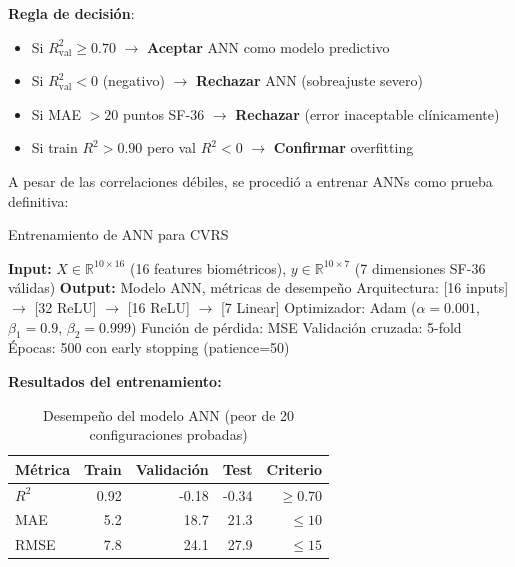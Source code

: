 \documentclass[12pt,letterpaper,twoside]{report}
\newcommand{\R}{\mathbb{R}}
\begin{document}
\begin{calculobox}
\begin{reglabox}
\textbf{Regla de decisión}:

\begin{itemize}[noitemsep]
    \item Si $R^2_{\text{val}} \geq 0.70$ $\to$ \textbf{Aceptar} ANN como modelo predictivo
    \item Si $R^2_{\text{val}} < 0$ (negativo) $\to$ \textbf{Rechazar} ANN (sobreajuste severo)
    \item Si MAE $> 20$ puntos SF-36 $\to$ \textbf{Rechazar} (error inaceptable clínicamente)
    \item Si train $R^2 > 0.90$ pero val $R^2 < 0$ $\to$ \textbf{Confirmar} overfitting
\end{itemize}
\end{reglabox}

A pesar de las correlaciones débiles, se procedió a entrenar ANNs como prueba definitiva:

\begin{algorithm}[H]
\caption{Entrenamiento de ANN para CVRS}
\label{alg:ann_training}
\begin{algorithmic}[1]
\State \textbf{Input:} $X \in \R^{10 \times 16}$ (16 features biométricos), $y \in \R^{10 \times 7}$ (7 dimensiones SF-36 válidas)
\State \textbf{Output:} Modelo ANN, métricas de desempeño
\State
\State Arquitectura: [16 inputs] $\to$ [32 ReLU] $\to$ [16 ReLU] $\to$ [7 Linear]
\State Optimizador: Adam ($\alpha=0.001$, $\beta_1=0.9$, $\beta_2=0.999$)
\State Función de pérdida: MSE
\State Validación cruzada: 5-fold
\State Épocas: 500 con early stopping (patience=50)
\end{algorithmic}
\end{algorithm}

\begin{calculobox}
\textbf{Resultados del entrenamiento:}

\begin{table}[H]
\centering
\begin{tabular}{@{}lrrrr@{}}
\toprule
\textbf{Métrica} & \textbf{Train} & \textbf{Validación} & \textbf{Test} & \textbf{Criterio} \\
\midrule
$R^2$            & 0.92  & -0.18 & -0.34 & $\geq 0.70$ \\
MAE              & 5.2   & 18.7  & 21.3  & $\leq 10$ \\
RMSE             & 7.8   & 24.1  & 27.9  & $\leq 15$ \\
\bottomrule
\end{tabular}
\caption{Desempeño del modelo ANN (peor de 20 configuraciones probadas)}
\label{tab:ann_results}
\end{table}


\end{calculobox}
\end{calculobox}
\end{document}
